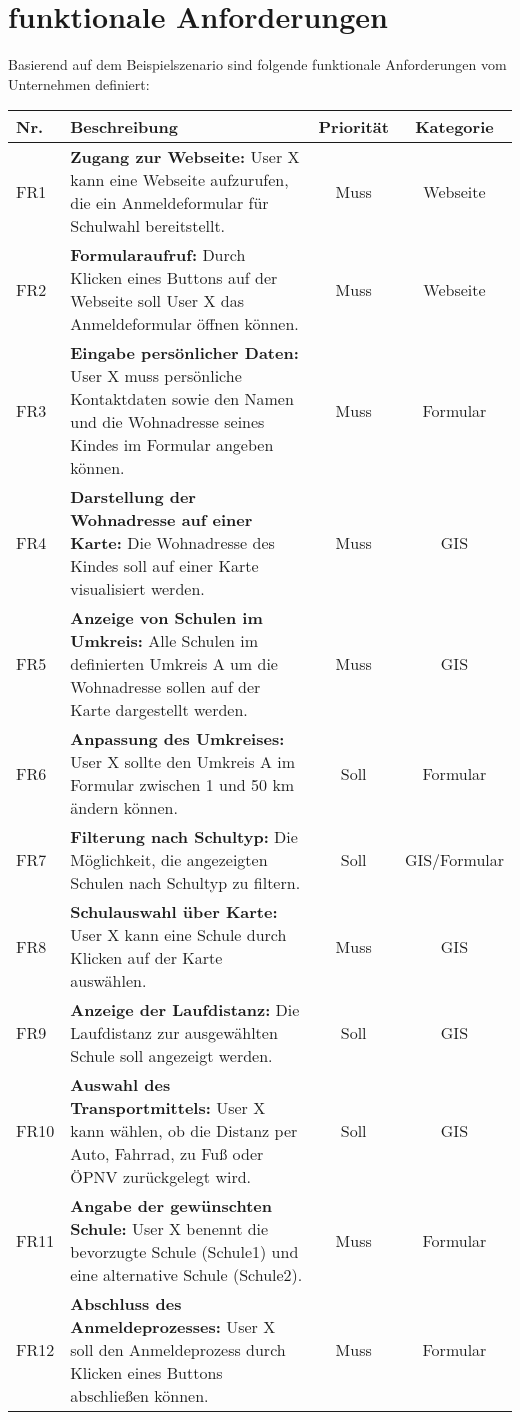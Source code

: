 \section{funktionale Anforderungen}

Basierend auf dem Beispielszenario sind folgende funktionale Anforderungen vom Unternehmen definiert:

\begin{center}
    \begin{tabular}{l p{8cm} c c}
        \hline
        \textbf{Nr.} & \textbf{Beschreibung} & \textbf{Priorität} & \textbf{Kategorie} \\ \hline
            FR1 &\textbf{Zugang zur Webseite:} User X kann eine Webseite aufzurufen, die ein Anmeldeformular für Schulwahl bereitstellt. &Muss &Webseite \\ 
            FR2 & \textbf{Formularaufruf:} Durch Klicken eines Buttons auf der Webseite soll User X das Anmeldeformular öffnen können. &Muss &Webseite \\ 
            FR3 & \textbf{Eingabe persönlicher Daten:} User X muss persönliche Kontaktdaten sowie den Namen und die Wohnadresse seines Kindes im Formular angeben können. &Muss &Formular \\ 
            FR4 & \textbf{Darstellung der Wohnadresse auf einer Karte:} Die Wohnadresse des Kindes soll auf einer Karte visualisiert werden. &Muss &GIS \\
            FR5 & \textbf{Anzeige von Schulen im Umkreis:} Alle Schulen im definierten Umkreis A um die Wohnadresse sollen auf der Karte dargestellt werden. &Muss &GIS \\ 
            FR6 & \textbf{Anpassung des Umkreises:} User X sollte den Umkreis A im Formular zwischen 1 und 50 km ändern können. &Soll &Formular \\ 
            FR7 & \textbf{Filterung nach Schultyp:} Die Möglichkeit, die angezeigten Schulen nach Schultyp zu filtern. &Soll &GIS/Formular \\ 
            FR8 & \textbf{Schulauswahl über Karte:} User X kann eine Schule durch Klicken auf der Karte auswählen. &Muss &GIS \\ 
            FR9 & \textbf{Anzeige der Laufdistanz:} Die Laufdistanz zur ausgewählten Schule soll angezeigt werden. &Soll &GIS \\ 
            FR10 & \textbf{Auswahl des Transportmittels:} User X kann wählen, ob die Distanz per Auto, Fahrrad, zu Fuß oder ÖPNV zurückgelegt wird. &Soll &GIS \\ 
            FR11 & \textbf{Angabe der gewünschten Schule:} User X benennt die bevorzugte Schule (Schule1) und eine alternative Schule (Schule2). &Muss &Formular \\ 
            FR12 & \textbf{Abschluss des Anmeldeprozesses:} User X soll den Anmeldeprozess durch Klicken eines Buttons abschließen können. &Muss &Formular \\ \hline
    \end{tabular}
\label{tab:meineTabelle}
\end{center}

